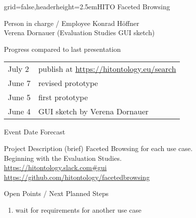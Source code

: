 \documentclass[english]{kiesgrube}
\begin{document}
\newcommand{\footer}[0]{\tikz{\draw (image.south west) node[anchor=west]{IMISE | MIG | Konrad Höffner | 2019-08-12};}}

\begin{poster}{grid=false,headerheight=2.5em}{}{HITO Faceted Browsing}{}{}
\begin{posterbox}[name=person,column=0,row=0]{Person in charge / Employee}
Konrad Höffner\\
Verena Dornauer (Evaluation Studies GUI sketch) 
\end{posterbox}
\begin{posterbox}[name=progress,below=person]{Progress compared to last presentation}
\begin{tabular}{ll}
July 2	&publish at \url{https://hitontology.eu/search}\\
June 7	&revised prototype\\
June 5	&first prototype\\
June 4	&GUI sketch by Verena Dornauer\\
\end{tabular}
\end{posterbox}
\begin{posterbox}[name=event,below=progress]{Event Date Forecast}
\end{posterbox}
\begin{posterbox}[name=description,column=1,row=0]{Project Description (brief)}
Faceted Browsing for each use case.\\
Beginning with the Evaluation Studies.\\
\url{https://hitontology.slack.com#gui}\\
\url{https://github.com/hitontology/facetedbrowsing}
\end{posterbox}
\begin{posterbox}[name=open,column=1,below=description]{Open Points / Next Planned Steps}
\begin{enumerate}
\item wait for requirements for another use case

\end{enumerate}
\end{posterbox}
\end{poster}
\end{document}
